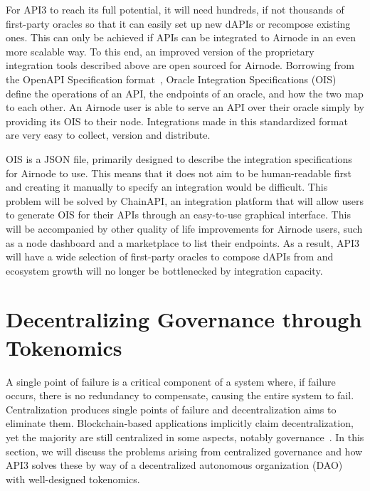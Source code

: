 \documentclass[11pt]{article}
\begin{document}
For API3 to reach its full potential, it will need hundreds, if not thousands of first-party oracles so that it can easily set up new dAPIs or recompose existing ones.
This can only be achieved if APIs can be integrated to Airnode in an even more scalable way.
To this end, an improved version of the proprietary integration tools described above are open sourced for Airnode.
Borrowing from the OpenAPI Specification format~\cite{oas}, Oracle Integration Specifications (OIS) define the operations of an API, the endpoints of an oracle, and how the two map to each other.
An Airnode user is able to serve an API over their oracle simply by providing its OIS to their node.
Integrations made in this standardized format are very easy to collect, version and distribute.

OIS is a JSON file, primarily designed to describe the integration specifications for Airnode to use.
This means that it does not aim to be human-readable first and creating it manually to specify an integration would be difficult.
This problem will be solved by ChainAPI, an integration platform that will allow users to generate OIS for their APIs through an easy-to-use graphical interface.
This will be accompanied by other quality of life improvements for Airnode users, such as a node dashboard and a marketplace to list their endpoints.
As a result, API3 will have a wide selection of first-party oracles to compose dAPIs from and ecosystem growth will no longer be bottlenecked by integration capacity.

\section{Decentralizing Governance through Tokenomics}
\label{sec:decentralizing-governance-through-tokenomics}

A single point of failure is a critical component of a system where, if failure occurs, there is no redundancy to compensate, causing the entire system to fail.
Centralization produces single points of failure and decentralization aims to eliminate them.
Blockchain-based applications implicitly claim decentralization, yet the majority are still centralized in some aspects, notably governance~\cite{Walch:2019}.
In this section, we will discuss the problems arising from centralized governance and how API3 solves these by way of a decentralized autonomous organization (DAO)~\cite{buterin:2014b} with well-designed tokenomics.
\end{document}
